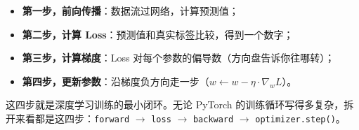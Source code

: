 \documentclass[a4paper,11pt]{ctexart}
\begin{document}
\begin{beginnerbox}
    \begin{itemize}
        \item \textbf{第一步，前向传播}：数据流过网络，计算预测值；
        \item \textbf{第二步，计算 Loss}：预测值和真实标签比较，得到一个数字；
        \item \textbf{第三步，计算梯度}：Loss 对每个参数的偏导数（方向盘告诉你往哪转）；
        \item \textbf{第四步，更新参数}：沿梯度负方向走一步（$w \leftarrow w - \eta \cdot \nabla_w L$）。
    \end{itemize}
    这四步就是深度学习训练的最小闭环。无论 PyTorch 的训练循环写得多复杂，拆开来看都是这四步：\texttt{forward} $\to$ \texttt{loss} $\to$ \texttt{backward} $\to$ \texttt{optimizer.step()}。
\end{beginnerbox}
\end{document}
